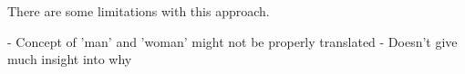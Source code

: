 There are some limitations with this approach.

- Concept of 'man' and 'woman' might not be properly translated
- Doesn't give much insight into why
